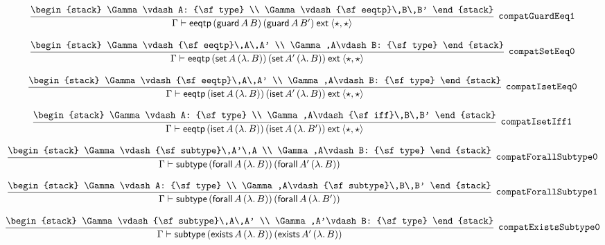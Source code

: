 \[
\infer[{\tt compatGuardEeq1}]{\Gamma \vdash {\sf eeqtp}\,({\sf guard}\,A\,B)\,({\sf guard}\,A\,B')\:{\sf ext}\:\langle \star ,\star \rangle }{
\begin{stack}
\Gamma \vdash A: {\sf type}
\\
\Gamma \vdash {\sf eeqtp}\,B\,B'
\end{stack}}
\]

\[
\infer[{\tt compatSetEeq0}]{\Gamma \vdash {\sf eeqtp}\,({\sf set}\,A\,(\lambda .\,B))\,({\sf set}\,A'\,(\lambda .\,B))\:{\sf ext}\:\langle \star ,\star \rangle }{
\begin{stack}
\Gamma \vdash {\sf eeqtp}\,A\,A'
\\
\Gamma ,A\vdash B: {\sf type}
\end{stack}}
\]

\[
\infer[{\tt compatIsetEeq0}]{\Gamma \vdash {\sf eeqtp}\,({\sf iset}\,A\,(\lambda .\,B))\,({\sf iset}\,A'\,(\lambda .\,B))\:{\sf ext}\:\langle \star ,\star \rangle }{
\begin{stack}
\Gamma \vdash {\sf eeqtp}\,A\,A'
\\
\Gamma ,A\vdash B: {\sf type}
\end{stack}}
\]

\[
\infer[{\tt compatIsetIff1}]{\Gamma \vdash {\sf eeqtp}\,({\sf iset}\,A\,(\lambda .\,B))\,({\sf iset}\,A\,(\lambda .\,B'))\:{\sf ext}\:\langle \star ,\star \rangle }{
\begin{stack}
\Gamma \vdash A: {\sf type}
\\
\Gamma ,A\vdash {\sf iff}\,B\,B'
\end{stack}}
\]

\[
\infer[{\tt compatForallSubtype0}]{\Gamma \vdash {\sf subtype}\,({\sf forall}\,A\,(\lambda .\,B))\,({\sf forall}\,A'\,(\lambda .\,B))}{
\begin{stack}
\Gamma \vdash {\sf subtype}\,A'\,A
\\
\Gamma ,A\vdash B: {\sf type}
\end{stack}}
\]

\[
\infer[{\tt compatForallSubtype1}]{\Gamma \vdash {\sf subtype}\,({\sf forall}\,A\,(\lambda .\,B))\,({\sf forall}\,A\,(\lambda .\,B'))}{
\begin{stack}
\Gamma \vdash A: {\sf type}
\\
\Gamma ,A\vdash {\sf subtype}\,B\,B'
\end{stack}}
\]

\[
\infer[{\tt compatExistsSubtype0}]{\Gamma \vdash {\sf subtype}\,({\sf exists}\,A\,(\lambda .\,B))\,({\sf exists}\,A'\,(\lambda .\,B))}{
\begin{stack}
\Gamma \vdash {\sf subtype}\,A\,A'
\\
\Gamma ,A'\vdash B: {\sf type}
\end{stack}}
\]

